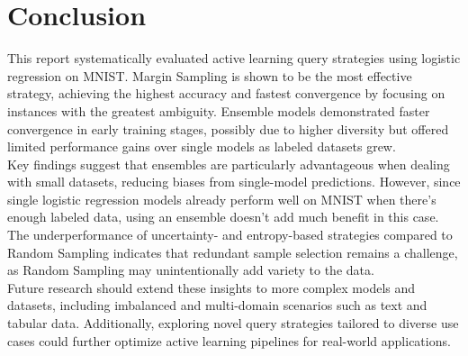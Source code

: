 \documentclass{article}
\theoremstyle{plain}
\theoremstyle{definition}
\theoremstyle{remark}
\begin{document}
\section{Conclusion}\label{sec:conclusion}
This report systematically evaluated active learning query strategies using logistic regression on MNIST. Margin Sampling is shown to be the most effective strategy, achieving the highest accuracy and fastest convergence by focusing on instances with the greatest ambiguity. Ensemble models demonstrated faster convergence in early training stages, possibly due to higher diversity but offered limited performance gains over single models as labeled datasets grew. \\
Key findings suggest that ensembles are particularly advantageous when dealing with small datasets, reducing biases from single-model predictions. However, since single logistic regression models already perform well on MNIST when there’s enough labeled data, using an ensemble doesn’t add much benefit in this case. The underperformance of uncertainty- and entropy-based strategies compared to Random Sampling indicates that redundant sample selection remains a challenge, as Random Sampling may unintentionally add variety to the data. \\
Future research should extend these insights to more complex models and datasets, including imbalanced and multi-domain scenarios such as text and tabular data. Additionally, exploring novel query strategies tailored to diverse use cases could further optimize active learning pipelines for real-world applications.



\end{document}
